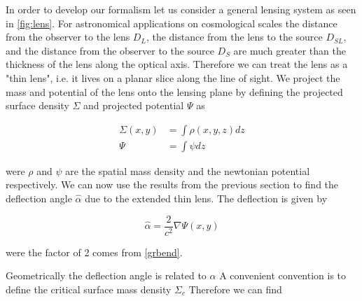 \par In order to develop our formalism let us consider a general lensing system as seen in \autoref{fig:lens}. For astronomical applications on cosmological scales the distance from the observer to the lens $D_L$, the distance from the lens to the source $D_{SL}$, and the distance from the observer to the source $D_S$ are much greater than the thickness of the lens along the optical axis. Therefore we can treat the lens as a "thin lens", i.e. it lives on a planar slice along the line of sight. We project the mass and potential of the lens onto the lensing plane by defining the projected surface density $\Sigma$ and projected potential $\Psi$ as

\begin{equation}
  \begin{split}
    \Sigma(x,y) &= \int \rho(x,y,z) dz \\
    \Psi &= \int \psi dz
  \end{split}
  \label{eq:surfacedensity+surfacepot}
\end{equation}

were $\rho$ and $\psi$ are the spatial mass density and the newtonian potential respectively. We can now use the results from the previous section to find the deflection angle $\hat{\alpha}$ due to the extended thin lens. The deflection is given by

\begin{equation}
  \hat{\alpha} = \frac{2}{c^2} \nabla \Psi(x,y)
  \label{eq:deflectionthinlens}
\end{equation}

were the factor of 2 comes from \autoref{grbend}. 

Geometrically the deflection angle is related to $\alpha$ A convenient convention is to define the critical surface mass density $\Sigma_c$ Therefore we can find 

